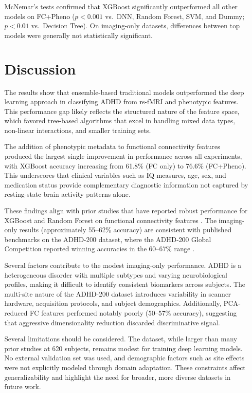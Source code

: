 \documentclass[conference]{IEEEtran}
\begin{document}
McNemar's tests confirmed that XGBoost significantly outperformed all other models on FC+Pheno ($p < 0.001$ vs.\ DNN, Random Forest, SVM, and Dummy; $p < 0.01$ vs.\ Decision Tree). On imaging-only datasets, differences between top models were generally not statistically significant.

\section{Discussion}
The results show that ensemble-based traditional models outperformed the deep learning approach in classifying ADHD from rs-fMRI and phenotypic features. This performance gap likely reflects the structured nature of the feature space, which favored tree-based algorithms that excel in handling mixed data types, non-linear interactions, and smaller training sets.

The addition of phenotypic metadata to functional connectivity features produced the largest single improvement in performance across all experiments, with XGBoost accuracy increasing from 61.8\% (FC only) to 76.6\% (FC+Pheno). This underscores that clinical variables such as IQ measures, age, sex, and medication status provide complementary diagnostic information not captured by resting-state brain activity patterns alone.

These findings align with prior studies that have reported robust performance for XGBoost and Random Forest on functional connectivity features \cite{taspinar2024, mahmoud2023}. The imaging-only results (approximately 55--62\% accuracy) are consistent with published benchmarks on the ADHD-200 dataset, where the ADHD-200 Global Competition reported winning accuracies in the 60--67\% range \cite{taspinar2024}.

Several factors contribute to the modest imaging-only performance. ADHD is a heterogeneous disorder with multiple subtypes and varying neurobiological profiles, making it difficult to identify consistent biomarkers across subjects. The multi-site nature of the ADHD-200 dataset introduces variability in scanner hardware, acquisition protocols, and subject demographics. Additionally, PCA-reduced FC features performed notably poorly (50--57\% accuracy), suggesting that aggressive dimensionality reduction discarded discriminative signal.

Several limitations should be considered. The dataset, while larger than many prior studies at 620 subjects, remains modest for training deep learning models. No external validation set was used, and demographic factors such as site effects were not explicitly modeled through domain adaptation. These constraints affect generalizability and highlight the need for broader, more diverse datasets in future work.
\end{document}
